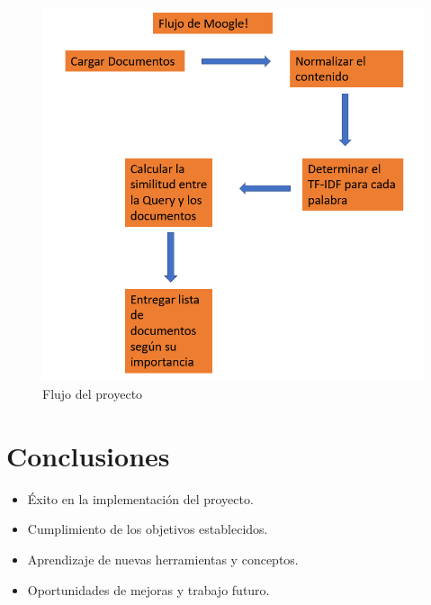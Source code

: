 \documentclass{article}
\begin{document}
\begin{figure}[h]
    \center
    \includegraphics[width=12cm]{flujoM.png}
    \caption{Flujo del proyecto}
\end{figure}

\section{Conclusiones}
\begin{itemize}
    \item Éxito en la implementación del proyecto.
    \item Cumplimiento de los objetivos establecidos.
    \item Aprendizaje de nuevas herramientas y conceptos.
    \item Oportunidades de mejoras y trabajo futuro.
\end{itemize}
\end{document}
